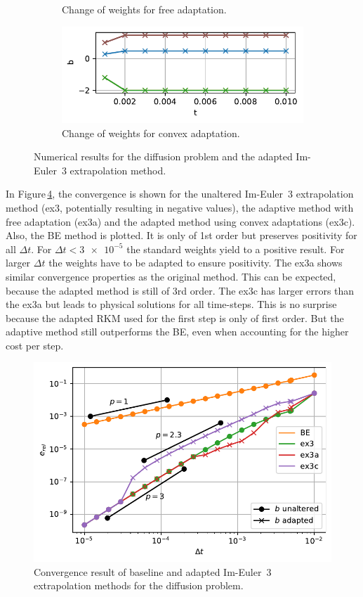 \documentclass[a4paper]{article}
\numberwithin{equation}{section}
\theoremstyle{plain}
\theoremstyle{definition}
\numberwithin{theorem}{section}
\newcommand{\dt}{{\Delta t}}
\newcommand{\1}{\mathbbm{1}}
\begin{document}
\begin{figure}
\begin{subfigure}[b]{0.45\textwidth}
\caption{Change of weights for free adaptation.}
\label{fig:weights_Diff_a}
\end{subfigure}
\begin{subfigure}[b]{0.45\textwidth}
\centering
\includegraphics[width=1\textwidth]{plots/b_Diff_Convex.pdf}
\caption{Change of weights for convex adaptation.}
\label{fig:weights_Diff_c}
\end{subfigure}
\caption{Numerical results for the diffusion problem and the
         adapted Im-Euler~3 extrapolation method.}
\end{figure}


In Figure\,\ref{fig:conv_impl}, the convergence is shown for the unaltered Im-Euler~3 extrapolation method (ex3, potentially resulting in negative values), the adaptive method with free adaptation (ex3a) and the adapted method using convex adaptations (ex3c).
Also, the BE method is plotted. It is only of 1st order but preserves positivity for all $\dt$. 
For $\dt < \num{3e-5} $ the standard weights yield to a positive result. For larger $\dt$ the weights have to be adapted to ensure positivity. 
The ex3a shows similar convergence properties as the original method.
This can be expected, because the adapted method is still of 3rd order. 
The ex3c has larger errors than the ex3a but leads to physical solutions for all time-steps.
This is no surprise because the adapted RKM used for the first step is only of first order.
But the adaptive method still outperforms the BE, even when accounting for the higher cost per step. 

\begin{figure}[ht]
\centering
\includegraphics[scale=0.75]{plots/conv_heat.pdf}
\caption{Convergence result of baseline and adapted Im-Euler~3
         extrapolation methods for the diffusion problem.}
\label{fig:conv_impl}
\end{figure}
\end{document}
